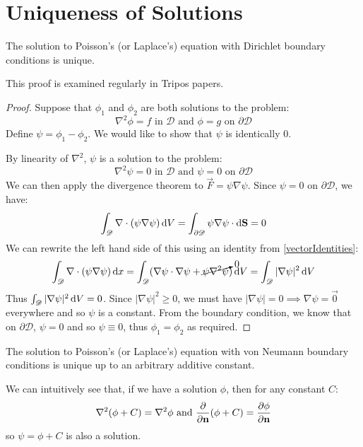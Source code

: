 \documentclass[../main.tex]{subfiles}
\begin{document}
\section{Uniqueness of Solutions}
\label{uniquenessOfSolutions}
\begin{theorem}
  The solution to Poisson's (or Laplace's) equation with Dirichlet boundary conditions is unique.
\end{theorem}
\begin{remark}[Exams]
  This proof is examined regularly in Tripos papers.
\end{remark}
\begin{proof}
  Suppose that $\phi_1$ and $\phi_2$ are both solutions to the problem:
  \[
    \nabla^2 \phi = f \text{ in } \mathscr{D} \text{ and } \phi = g \text{ on } \partial \mathscr{D}
  \]
  Define $\psi = \phi_1 - \phi_2$.
  We would like to show that $\psi$ is identically 0.

  By linearity of $\nabla^2$, $\psi$ is a solution to the problem:
  \[
    \nabla^2 \psi = 0 \text{ in } \mathscr{D} \text{ and } \psi = 0 \text{ on } \partial \mathscr{D}
  \]
  We can then apply the divergence theorem to $\vec{F} = \psi \nabla \psi$.
  Since $\psi = 0$ on $\partial \mathscr{D}$, we have:
  \[
    \int_{\mathscr{D}} \nabla \cdot (\psi \nabla \psi) \d{V} = \int_{\partial \mathscr{D}} \psi \nabla \psi \cdot \d{\vec{S}} = 0
  \]
  We can rewrite the left hand side of this using an identity from \cref{vectorIdentities}:
  \begin{align*}
    \int_{\mathscr{D}} \nabla \cdot (\psi \nabla \psi) \d{x} = \int_{\mathscr{D}} (\nabla \psi \cdot \nabla \psi + \cancelto{0}{\psi \nabla^2 \psi}) \d{V} = \int_{\mathscr{D}} |\nabla \psi|^2 \d{V}
  \end{align*}
  Thus $\int_{\mathscr{D}} |\nabla \psi|^2 \d{V} = 0$.
  Since $|\nabla \psi|^2 \geq 0$, we must have $|\nabla \psi| = 0 \implies \nabla \psi = \vec{0}$ everywhere and so $\psi$ is a constant.
  From the boundary condition, we know that on $\partial \mathscr{D}$, $\psi = 0$ and so $\psi \equiv 0$, thus $\phi_1 = \phi_2$ as required.
\end{proof}
\begin{theorem}
  The solution to Poisson's (or Laplace's) equation with von Neumann boundary conditions is unique up to an arbitrary additive constant.
\end{theorem}
\begin{remark}
  We can intuitively see that, if we have a solution $\phi$, then for any constant $C$:
  \[
    \nabla^2(\phi + C) = \nabla^2 \phi \text{ and } \pderiv{}{\vec{n}}(\phi + C) = \pderiv{\phi}{\vec{n}}
  \]
  so $\psi = \phi + C$ is also a solution.
\end{remark}
\end{document}
